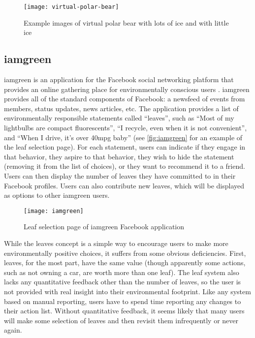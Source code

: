 \begin{figure}[htbp]
	\centering
		\texttt{[image: virtual-polar-bear]}
		\caption{Example images of virtual polar bear with lots of ice and with little ice}
		\label{fig:virtual-polar-bear}
\end{figure}

\subsection{iamgreen}
\label{sec:iamgreen}

iamgreen is an application for the Facebook social networking platform that provides an online gathering place for environmentally conscious users \cite{iamgreen-website}. iamgreen provides all of the standard components of Facebook: a newsfeed of events from members, status updates, news articles, etc. The application provides a list of environmentally responsible statements called ``leaves'', such as ``Most of my lightbulbs are compact fluorescents'', ``I recycle, even when it is not convenient'', and ``When I drive, it's over 40mpg baby'' (see \autoref{fig:iamgreen} for an example of the leaf selection page). For each statement, users can indicate if they engage in that behavior, they aspire to that behavior, they wish to hide the statement (removing it from the list of choices), or they want to recommend it to a friend. Users can then display the number of leaves they have committed to in their Facebook profiles. Users can also contribute new leaves, which will be displayed as options to other iamgreen users.

\begin{figure}[htbp]
	\centering
		\texttt{[image: iamgreen]}
		\caption{Leaf selection page of iamgreen Facebook application}
		\label{fig:iamgreen}
\end{figure}

While the leaves concept is a simple way to encourage users to make more environmentally positive choices, it suffers from some obvious deficiencies. First, leaves, for the most part, have the same value (though apparently some actions, such as not owning a car, are worth more than one leaf). The leaf system also lacks any quantitative feedback other than the number of leaves, so the user is not provided with real insight into their environmental footprint. Like any system based on manual reporting, users have to spend time reporting any changes to their action list. Without quantitative feedback, it seems likely that many users will make some selection of leaves and then revisit them infrequently or never again.


